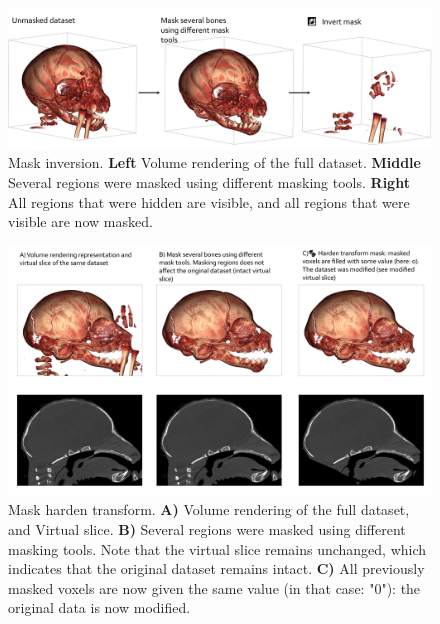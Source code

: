 \begin{figure}
  \centering
  \includegraphics[scale=0.2]{images/14/invert_mask/invert_mask.png}
\caption{Mask inversion.  \textbf{Left} Volume rendering of the full dataset. \textbf{Middle} Several regions were masked using different masking tools. \textbf{Right} All regions that were hidden are visible, and all regions that were visible are now masked.}	 
\label{invert_mask}
 \end{figure}

\begin{figure}
  \centering
  \includegraphics[scale=0.17]{images/14/harden_mask/harden_example.png}
\caption{Mask harden transform.  \textbf{A)} Volume rendering of the full dataset, and Virtual slice. \textbf{B)} Several regions were masked using different masking tools. Note that the virtual slice remains unchanged, which indicates that the original dataset remains intact. \textbf{C)} All previously masked voxels are now given the same value (in that case: "0"): the original data is now modified.}	 
\label{harden_mask}
 \end{figure}



